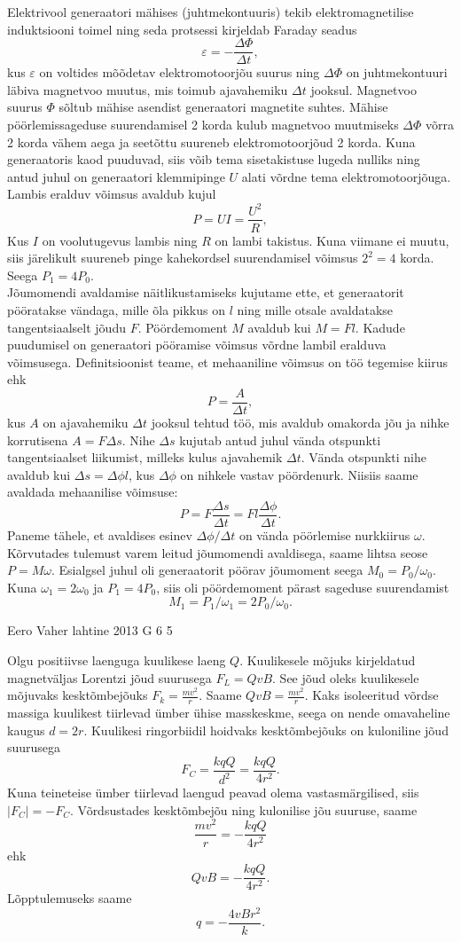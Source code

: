 \documentclass[11pt, twoside]{article}
\begin{document}
{{\ifSolution
\osa Elektrivool generaatori mähises (juhtmekontuuris) tekib elektromagnetilise induktsiooni toimel ning seda protsessi kirjeldab Faraday seadus
$$
\varepsilon = -\frac{\Delta\Phi}{\Delta t},
$$
kus $\varepsilon$ on voltides mõõdetav elektromotoorjõu suurus ning $\Delta\Phi$ on juhtmekontuuri läbiva magnetvoo muutus, mis toimub ajavahemiku $\Delta t$ jooksul. Magnetvoo suurus $\Phi$ sõltub mähise asendist generaatori magnetite suhtes. Mähise pöörlemissageduse suurendamisel 2 korda kulub magnetvoo muutmiseks $\Delta\Phi$ võrra 2 korda vähem aega ja seetõttu suureneb elektromotoorjõud 2 korda. Kuna generaatoris kaod puuduvad, siis võib tema sisetakistuse lugeda nulliks ning antud juhul on generaatori klemmipinge $U$ alati võrdne tema elektromotoorjõuga. Lambis eralduv võimsus avaldub kujul
$$
P = UI = \frac{U^2}{R},
$$
Kus $I$ on voolutugevus lambis ning $R$ on lambi takistus. Kuna viimane ei muutu, siis järelikult suureneb pinge kahekordsel suurendamisel võimsus $2^2=4$ korda. Seega $P_1=4P_0$.\\
\osa Jõumomendi avaldamise näitlikustamiseks kujutame ette, et generaatorit pööratakse vändaga, mille õla pikkus on $l$ ning mille otsale avaldatakse tangentsiaalselt jõudu $F$. Pöördemoment $M$ avaldub kui $M=Fl$. Kadude puudumisel on generaatori pööramise võimsus võrdne lambil eralduva võimsusega. Definitsioonist teame, et mehaaniline võimsus on töö tegemise kiirus ehk
$$
P = \frac{A}{\Delta t},
$$
kus $A$ on ajavahemiku $\Delta t$ jooksul tehtud töö, mis avaldub omakorda jõu ja nihke korrutisena $A=F \Delta s$. Nihe $\Delta s$ kujutab antud juhul vända otspunkti tangentsiaalset liikumist, milleks kulus ajavahemik $\Delta t$. Vända otspunkti nihe avaldub kui $\Delta s=\Delta\phi l$, kus $\Delta\phi$ on nihkele vastav pöördenurk. Niisiis saame avaldada mehaanilise võimsuse:
$$
P = F \frac{\Delta s}{\Delta t} =Fl \frac{\Delta\phi}{\Delta t}.
$$
Paneme tähele, et avaldises esinev $\Delta\phi / \Delta t$ on vända pöörlemise nurkkiirus $\omega$. Kõrvutades tulemust varem leitud jõumomendi avaldisega, saame lihtsa seose $P=M\omega$. Esialgsel juhul oli generaatorit pöörav jõumoment seega
$M_0 = P_0/\omega_0$. Kuna $\omega_1=2\omega_0$ ja $P_1=4P_0$, siis oli pöördemoment pärast sageduse suurendamist
\[
M_1 = P_1/\omega_1=2P_0/\omega_0.
\]
\fi
}

{Eero Vaher} %
{lahtine} %
{2013} %
{G 6} %
{5} %
{

\ifSolution
Olgu positiivse laenguga kuulikese laeng $Q$. Kuulikesele mõjuks kirjeldatud magnetväljas Lorentzi jõud suurusega $F_L=QvB$. See jõud oleks kuulikesele mõjuvaks kesktõmbejõuks $F_k=\frac{mv^2}{r}$. Saame $QvB=\frac{mv^2}{r}$. Kaks isoleeritud võrdse massiga kuulikest tiirlevad ümber ühise masskeskme, seega on nende omavaheline kaugus $d=2r$. Kuulikesi ringorbiidil hoidvaks kesktõmbejõuks on kuloniline jõud suurusega 
\[
F_C=\frac{kqQ}{d^2}=\frac{kqQ}{4r^2}.
\]
Kuna teineteise ümber tiirlevad laengud peavad olema vastasmärgilised, siis $|F_C|=-F_C$. Võrdsustades kesktõmbejõu ning kulonilise jõu suuruse, saame
\[
\frac{mv^2}{r}=-\frac{kqQ}{4r^2}
\]
ehk
\[
QvB=-\frac{kqQ}{4r^2}.
\]
Lõpptulemuseks saame 
\[
q=-\frac{4vBr^2}{k}.
\]
\fi
}

}
\end{document}
